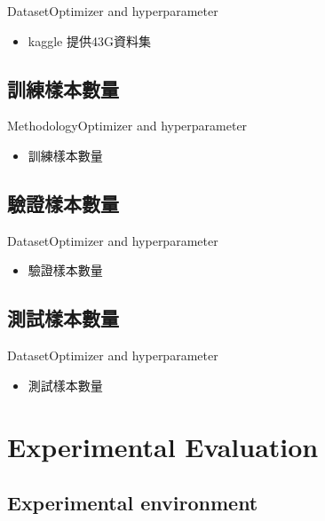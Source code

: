 \documentclass{beamer}
\begin{document}
\begin{CJK}{UTF8}{}
\begin{frame}{Dataset}{Optimizer and hyperparameter}
	\begin{itemize}
	\item{
		kaggle 提供43G資料集
	}
	\end{itemize}
\end{frame}

\subsection{訓練樣本數量}

\begin{frame}{Methodology}{Optimizer and hyperparameter}
	\begin{itemize}
	\item{
		訓練樣本數量
	}
	\end{itemize}
\end{frame}

\subsection{驗證樣本數量}

\begin{frame}{Dataset}{Optimizer and hyperparameter}
	\begin{itemize}
	\item{
		驗證樣本數量
	}
	\end{itemize}
\end{frame}

\subsection{測試樣本數量}

\begin{frame}{Dataset}{Optimizer and hyperparameter}
	\begin{itemize}
	\item{
		測試樣本數量
	}
	\end{itemize}
\end{frame}

\section{Experimental Evaluation}

\subsection{Experimental environment}


\end{CJK}
\end{document}
